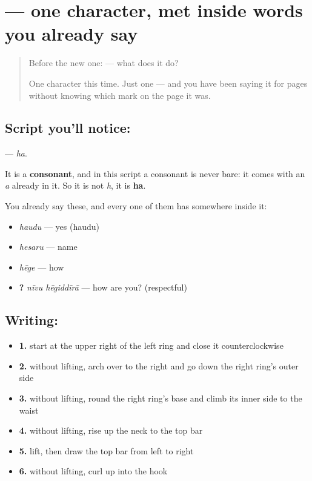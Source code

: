 \section[\texorpdfstring{\kn{ಹ} (ha)}{ಹ (ha)}]{ — one character, met inside words you already say}

\label{lesson:KA-S120-letter-ha}



\begin{quote}
Before the new one:  — what does it do?

One character this time. Just one — and you have been saying it for pages without knowing which mark on the page it was.
\end{quote}

\subsection*{Script you'll notice: }
\textbf{} — \emph{ha}.

It is a \textbf{consonant}, and in this script a consonant is never bare: it comes with an \emph{a} already in it. So it is not \emph{h}, it is \textbf{ha}.

You already say these, and every one of them has  somewhere inside it:

\begin{itemize}
\raggedright
  \item \textbf{} \emph{haudu} — yes (haudu)
  \item \textbf{} \emph{hesaru} — name
  \item \textbf{} \emph{hēge} — how
  \item \textbf{ ?} \emph{nīvu hēgiddīrā} — how are you? (respectful)
\end{itemize}

\subsection*{Writing: }

\begin{itemize}
\raggedright
  \item \textbf{1.} start at the upper right of the left ring and close it counterclockwise
  \item \textbf{2.} without lifting, arch over to the right and go down the right ring's outer side
  \item \textbf{3.} without lifting, round the right ring's base and climb its inner side to the waist
  \item \textbf{4.} without lifting, rise up the neck to the top bar
  \item \textbf{5.} lift, then draw the top bar from left to right
  \item \textbf{6.} without lifting, curl up into the hook
\end{itemize}

